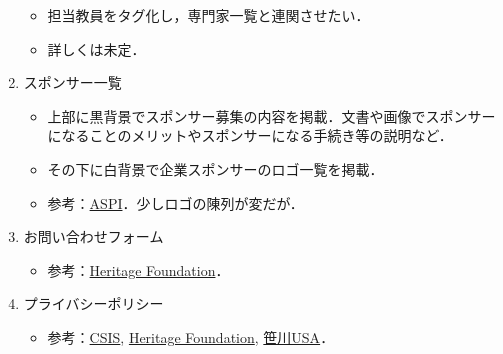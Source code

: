 \documentclass[uplatex,dvipdfmx]{jsarticle}
\begin{document}
\begin{enumerate}
\begin{itemize}
        \item 担当教員をタグ化し，専門家一覧と連関させたい．
        \item 詳しくは未定．
    \end{itemize}
    \item スポンサー一覧
    \begin{itemize}
        \item 上部に黒背景でスポンサー募集の内容を掲載．文書や画像でスポンサーになることのメリットやスポンサーになる手続き等の説明など．
        \item その下に白背景で企業スポンサーのロゴ一覧を掲載．
        \item 参考：\href{https://www.aspi.org.au/sponsors}{ASPI}．少しロゴの陳列が変だが．
    \end{itemize}
    \item お問い合わせフォーム
    \begin{itemize}
        \item 参考：\href{https://www.heritage.org/contact}{Heritage Foundation}．
    \end{itemize}
    \item プライバシーポリシー
    \begin{itemize}
        \item 参考：\href{https://www.csis.org/privacy-policy}{CSIS}, \href{https://www.heritage.org/article/privacy-policy}{Heritage Foundation}, \href{https://spfusa.org/privacy-policy/}{笹川USA}．
    \end{itemize}
\end{enumerate}
\end{document}
